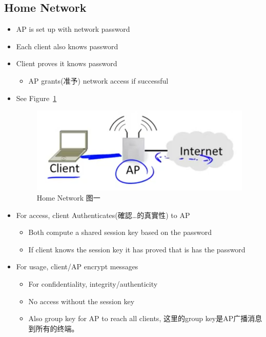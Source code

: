\documentclass[12pt]{ctexart}   %
\begin{document}
	\subsection{Home Network}
	\begin{itemize}
		\item AP is set up with network password
		\item Each client also knows password
		\item Client proves it knows password
		\begin{itemize}
			\item AP grants(准予) network access if successful
		\end{itemize}
		\item See Figure~\ref{fig:10-4-4}
		  
		\begin{figure}[h!] %
		\centering
		\includegraphics[scale=0.7]{images/10-4-4}
		\caption{Home Network 图一}
		\label{fig:10-4-4}
		\end{figure}

		\item For access, client Authenticates(確認…的真實性) to AP
		\begin{itemize}
			\item Both compute a shared session key based on the password
			\item If client knows the session key it has proved that is has the password
		\end{itemize}

		\item For usage, client/AP encrypt messages
		\begin{itemize}
			\item For confidentiality, integrity/authenticity
			\item No access without the session key
			\item Also group key for AP to reach all clients, 这里的group key是AP广播消息到所有的终端。
		\end{itemize}


\end{itemize}
\end{document}
